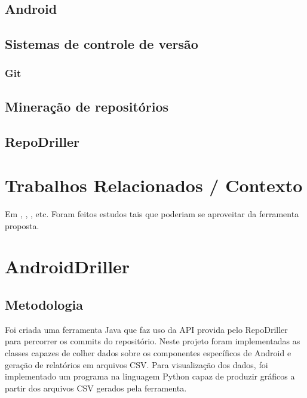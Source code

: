\documentclass[a4paper,12pt]{article}
\begin{document}
\subsection{Android}
\subsection{Sistemas de controle de versão}
\subsubsection{Git}
\subsection{Mineração de repositórios}
\subsection{RepoDriller}
\cite{repodriller}

\newpage
\section{Trabalhos Relacionados / Contexto}
Em \cite{Calciati}, \cite{WhoAdded}, \cite{YLyu}, etc. Foram feitos estudos tais que poderiam se aproveitar da ferramenta proposta.


\newpage
\section{AndroidDriller}

\subsection{Metodologia}

Foi criada uma ferramenta Java que faz uso da API provida pelo RepoDriller para
percorrer os commits do repositório. Neste projeto foram implementadas as
classes capazes de colher dados sobre os componentes específicos de Android e
geração de relatórios em arquivos CSV. Para visualização dos dados, foi
implementado um programa na linguagem Python capaz de produzir gráficos a
partir dos arquivos CSV gerados pela ferramenta.\\
\end{document}
